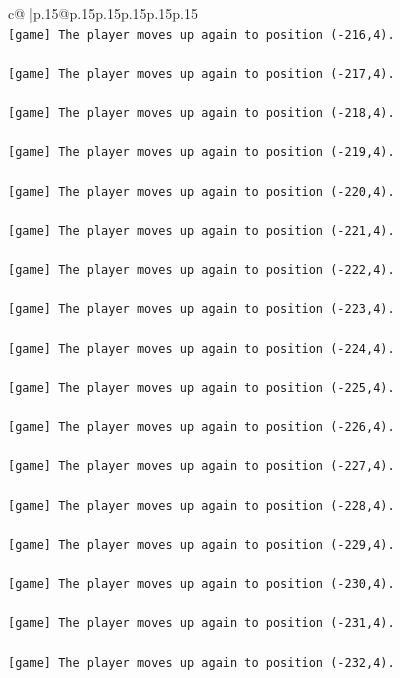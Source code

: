 \documentclass{article}
\begin{document}
{\begin{supertabular}{c@{$\;$}|p{.15\linewidth}@{}p{.15\linewidth}p{.15\linewidth}p{.15\linewidth}p{.15\linewidth}p{.15\linewidth}}
{{{\\ 
\texttt{{[}game{]} The player moves up again to position ({-}216,4).} \\
\\ 
\texttt{{[}game{]} The player moves up again to position ({-}217,4).} \\
\\ 
\texttt{{[}game{]} The player moves up again to position ({-}218,4).} \\
\\ 
\texttt{{[}game{]} The player moves up again to position ({-}219,4).} \\
\\ 
\texttt{{[}game{]} The player moves up again to position ({-}220,4).} \\
\\ 
\texttt{{[}game{]} The player moves up again to position ({-}221,4).} \\
\\ 
\texttt{{[}game{]} The player moves up again to position ({-}222,4).} \\
\\ 
\texttt{{[}game{]} The player moves up again to position ({-}223,4).} \\
\\ 
\texttt{{[}game{]} The player moves up again to position ({-}224,4).} \\
\\ 
\texttt{{[}game{]} The player moves up again to position ({-}225,4).} \\
\\ 
\texttt{{[}game{]} The player moves up again to position ({-}226,4).} \\
\\ 
\texttt{{[}game{]} The player moves up again to position ({-}227,4).} \\
\\ 
\texttt{{[}game{]} The player moves up again to position ({-}228,4).} \\
\\ 
\texttt{{[}game{]} The player moves up again to position ({-}229,4).} \\
\\ 
\texttt{{[}game{]} The player moves up again to position ({-}230,4).} \\
\\ 
\texttt{{[}game{]} The player moves up again to position ({-}231,4).} \\
\\ 
\texttt{{[}game{]} The player moves up again to position ({-}232,4).} \\
}}}
\end{supertabular}}
\end{document}
